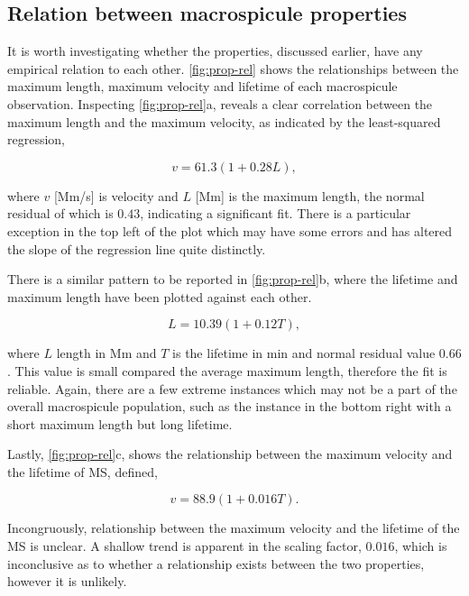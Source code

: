 \subsection{Relation between macrospicule properties}
It is worth investigating whether the properties, discussed earlier, have any empirical relation to each other. \cref{fig:prop-rel} shows the relationships between the maximum length, maximum velocity and lifetime of each macrospicule observation. Inspecting \cref{fig:prop-rel}a, reveals a clear correlation between the maximum length and the maximum velocity, as indicated by the least-squared regression, 

\begin{equation}
v = 61.3(1 + 0.28L),
\end{equation}

\noindent where $v$ [Mm/s] is velocity and $L$ [Mm] is the maximum length, the normal residual of which is $0.43$, indicating a significant fit. There is a particular exception in the top left of the plot which may have some errors and has altered the slope of the regression line quite distinctly.

There is a similar pattern to be reported in \cref{fig:prop-rel}b, where the lifetime and maximum length have been plotted against each other.

\begin{equation}
L = 10.39(1 + 0.12T),
\end{equation}

\noindent where $L$ length in Mm and $T$ is the lifetime in min and normal residual value $0.66$. This value is small compared the average maximum length, therefore the fit is reliable. Again, there are a few extreme instances which may not be a part of the overall macrospicule population, such as the instance in the bottom right with a short maximum length but long lifetime. 

Lastly, \cref{fig:prop-rel}c, shows the relationship between the maximum velocity and the lifetime of MS, defined,

\begin{equation}
v = 88.9(1 + 0.016T).
\end{equation}

Incongruously, relationship between the maximum velocity and the lifetime of the MS is unclear. A shallow trend is apparent in the scaling factor, $0.016$, which is inconclusive as to whether a relationship exists between the two properties, however it is unlikely.

